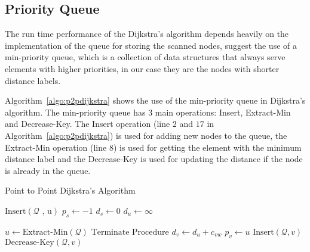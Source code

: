 \subsection{Priority Queue}
The run time performance of the Dijkstra's algorithm depends heavily on the implementation of the queue for storing the scanned nodes,
\citet{Cormen} suggest the use of a min-priority queue,
which is a collection of data structures that always serve elements with higher priorities, in our case they are the nodes with shorter distance labels.

Algorithm~\ref{algo:p2pdijkstra} shows the use of the min-priority queue in Dijkstra's algorithm.
The min-priority queue has 3 main operations: Insert, Extract-Min and Decrease-Key.
The Insert operation (line $2$ and $17$ in Algorithm~\ref{algo:p2pdijkstra}) is used for adding new nodes to the queue, the Extract-Min operation (line 8) is used for getting the element with the minimum distance label and the Decrease-Key is used for updating the distance if the node is already in the queue.

\begin{algorithm}[H]
    \caption{Point to Point Dijkstra's Algorithm}
    \label{algo:p2pdijkstra}
    \begin{algorithmic}[1]
        \State $\text{Insert}(\mathcal{Q}\text{ , u})$ 
        \State $p_s \gets -1$ 
        \State $d_s \gets 0$
         
        \State $d_u \gets \infty$
    \EndFor

    \State $ u \gets \text{Extract-Min}(\mathcal{Q}) $ 
    \State $\text{Terminate Procedure}$ 
\EndIf
{}
 
\State $d_v \gets d_u + c_{vw}$
\State $p_v \gets u$
\State $\text{Insert}(\mathcal{Q}, v)$ 
\Else
\State $\text{Decrease-Key}(\mathcal{Q}, v)$ 
    \EndIf
\EndIf
                \EndFor
            \EndIf
        \EndWhile
    \EndProcedure
\end{algorithmic}
\end{algorithm}



